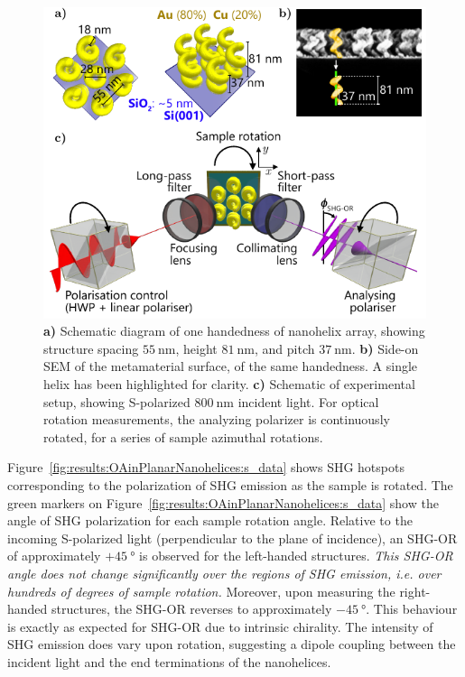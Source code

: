\begin{figure}[htb!]	
    \centering	
    \includegraphics[scale=1.0]{./figures/results/OAinPlanarNanohelices/setup.pdf}
    \caption{\label{fig:results:OAinPlanarNanohelices:setup}
    \textbf{a)} Schematic diagram of one handedness of nanohelix array, showing structure spacing $\SI{55}{\nano\m}$, height $\SI{81}{\nano\m}$, and pitch $\SI{37}{\nano\m}$. \textbf{b)} Side-on SEM of the metamaterial surface, of the same handedness. A single helix has been highlighted for clarity. \textbf{c)} Schematic of experimental setup, showing S-polarized $\SI{800}{\nano\m}$ incident light. For optical rotation measurements, the analyzing polarizer is continuously rotated, for a series of sample azimuthal rotations.}	
\end{figure}

Figure~\ref{fig:results:OAinPlanarNanohelices:s_data} shows SHG hotspots corresponding to the polarization of SHG emission as the sample is rotated. The green markers on Figure~\ref{fig:results:OAinPlanarNanohelices:s_data} show the angle of SHG polarization for each sample rotation angle. Relative to the incoming S-polarized light (perpendicular to the plane of incidence), an SHG-OR of approximately $+\SI{45}{\degree}$ is observed for the left-handed structures. \textit{This SHG-OR angle does not change significantly over the regions of SHG emission, i.e. over hundreds of degrees of sample rotation.} 
Moreover, upon measuring the right-handed structures, the SHG-OR reverses to approximately $-\SI{45}{\degree}$. This behaviour is exactly as expected for SHG-OR due to intrinsic chirality. The intensity of SHG emission does vary upon rotation, suggesting a dipole coupling between the incident light and the end terminations of the nanohelices. 



